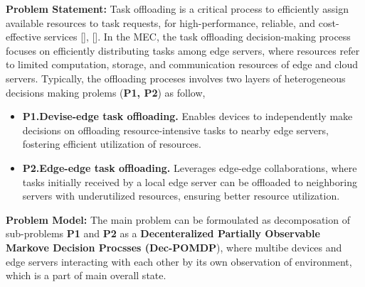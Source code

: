 \documentclass[12pt]{article}
\begin{document}
\vspace{2mm}

\noindent\textbf{\large Problem Statement: }
\noindent
Task offloading is a critical process to efficiently assign available resources to task requests, for high-performance, reliable, and cost-effective services [], []. In the MEC, the task offloading decision-making process focuses on efficiently distributing tasks among edge servers, where resources refer to limited computation, storage, and communication resources of edge and cloud servers. Typically, the offloading proceses involves two layers of heterogeneous decisions making prolems (\textbf{P1, P2}) as follow,
\vspace{-2mm}
\begin{itemize}
	\item\textbf{P1.\hspace{2mm}Devise-edge task offloading.} Enables devices to independently make decisions on offloading resource-intensive tasks to nearby edge servers, fostering efficient utilization of resources.\vspace{-2mm}
	\item\textbf{P2.\hspace{2mm}Edge-edge task offloading.} Leverages edge-edge collaborations, where tasks initially received by a local edge server can be offloaded to neighboring servers with underutilized resources, ensuring better resource utilization. %
\end{itemize}

\noindent\textbf{\large Problem Model: }
\noindent
The main problem can be formoulated as decomposation of sub-problems \textbf{P1} and \textbf{P2} as a \textbf{Decenteralized Partially Observable Markove Decision Procsses (Dec-POMDP}), where multibe devices and edge servers interacting with each other by its own observation of environment, which is a part of main overall state. 

\vspace{3mm}
\end{document}
